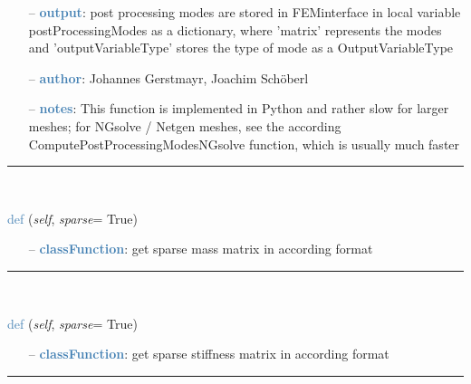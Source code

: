 \begin{itemize}[leftmargin=1.4cm]
\begin{itemize}[leftmargin=0.5cm]
\begin{itemize}[leftmargin=1.4cm]
\begin{itemize}[leftmargin=0.5cm]
\begin{itemize}[leftmargin=0.7cm]
  \item[--]  \textcolor{steelblue}{\bf output}: post processing modes are stored in FEMinterface in local variable postProcessingModes as a dictionary, where 'matrix' represents the modes and 'outputVariableType' stores the type of mode as a OutputVariableType  \item[--]  \textcolor{steelblue}{\bf author}: Johannes Gerstmayr, Joachim Sch\"oberl  \item[--]  \textcolor{steelblue}{\bf notes}: This function is implemented in Python and rather slow for larger meshes; for NGsolve / Netgen meshes, see the according ComputePostProcessingModesNGsolve function, which is usually much faster\vspace{12pt}\end{itemize}
%
\noindent\rule{8cm}{0.75pt}\vspace{1pt} \\ 
\begin{flushleft}
\noindent \textcolor{steelblue}{def {\bf {}}}\label{sec:FEM:FEMinterface:GetMassMatrix}
({\it self}, {\it sparse}= True)
\end{flushleft}
\setlength{\itemindent}{0.7cm}
\begin{itemize}[leftmargin=0.7cm]
  \item[--]  \textcolor{steelblue}{\bf classFunction}: get sparse mass matrix in according format\vspace{12pt}\end{itemize}
%
\noindent\rule{8cm}{0.75pt}\vspace{1pt} \\ 
\begin{flushleft}
\noindent \textcolor{steelblue}{def {\bf {}}}\label{sec:FEM:FEMinterface:GetStiffnessMatrix}
({\it self}, {\it sparse}= True)
\end{flushleft}
\setlength{\itemindent}{0.7cm}
\begin{itemize}[leftmargin=0.7cm]
  \item[--]  \textcolor{steelblue}{\bf classFunction}: get sparse stiffness matrix in according format\vspace{12pt}\end{itemize}
%
\noindent\rule{8cm}{0.75pt}\vspace{1pt} \\ 
\begin{flushleft}

\end{flushleft}
\end{itemize}
\end{itemize}
\end{itemize}
\end{itemize}

